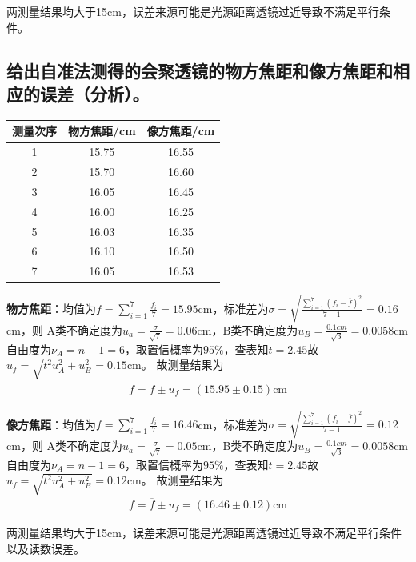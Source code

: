 \documentclass[dvipsnames, svgnames,a4paper,11pt]{article}
\begin{document}
两测量结果均大于15cm，误差来源可能是光源距离透镜过近导致不满足平行条件。
\subsection{给出自准法测得的会聚透镜的物方焦距和像方焦距和相应的误差（分析）。}
\begin{table}[H]
	\centering
	\begin{tabular}{ccc}
		\toprule
		测量次序&物方焦距/cm&像方焦距/cm\\
		\midrule
		1&15.75&16.55\\
		2&15.70&16.60\\
		3&16.05&16.45\\
		4&16.00&16.25\\
		5&16.03&16.35\\
		6&16.10&16.50\\
		7&16.05&16.53\\
		\toprule
	\end{tabular}
\end{table}
\textbf{物方焦距}：均值为$\overline{f}=\sum_{i=1}^{7}\frac{f_i}{7}=15.95$cm，标准差为$\sigma=\sqrt{\frac{\sum_{i=1}^{7}(f_i-\overline{f})^2}{7-1}}=0.16$cm，则
A类不确定度为$u_a=\frac{\sigma}{\sqrt{7}}=0.06$cm，B类不确定度为$u_B=\frac{0.1cm}{\sqrt{3}}=0.0058$cm
自由度为$\nu_A=n-1=6$，取置信概率为$95\%$，查表知$t=2.45$故$u_f=\sqrt{t^2u_A^2+u_B^2}=0.15$cm。
故测量结果为
\begin{align*}
	f=\overline{f}\pm u_f=(15.95\pm0.15)\text{cm}
\end{align*}\par

\textbf{像方焦距}：均值为$\overline{f}=\sum_{i=1}^{7}\frac{f_i}{7}=16.46$cm，标准差为$\sigma=\sqrt{\frac{\sum_{i=1}^{7}(f_i-\overline{f})^2}{7-1}}=0.12$cm，则
A类不确定度为$u_a=\frac{\sigma}{\sqrt{7}}=0.05$cm，B类不确定度为$u_B=\frac{0.1cm}{\sqrt{3}}=0.0058$cm
自由度为$\nu_A=n-1=6$，取置信概率为$95\%$，查表知$t=2.45$故$u_f=\sqrt{t^2u_A^2+u_B^2}=0.12$cm。
故测量结果为
\begin{align*}
    f=\overline{f}\pm u_f=(16.46\pm0.12)\text{cm}
\end{align*}\par


两测量结果均大于15cm，误差来源可能是光源距离透镜过近导致不满足平行条件以及读数误差。
\end{document}
